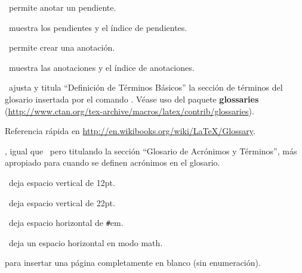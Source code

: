 
\pa\ permite anotar un pendiente.

\ muestra los pendientes y el índice de pendientes.


\pa\ permite crear una anotación.

\ muestra las anotaciones y el índice de anotaciones.



\ ajusta y titula ``Definición de Términos Básicos'' la sección de términos del glosario insertada por el comando . Véase uso del paquete \textbf{glossaries} (\url{http://www.ctan.org/tex-archive/macros/latex/contrib/glossaries}).

Referencia rápida en \url{http://en.wikibooks.org/wiki/LaTeX/Glossary}.

, igual que \ pero titulando la sección ``Glosario de Acrónimos y Términos'', más apropiado para cuando se definen acrónimos en el glosario.



\ deja espacio vertical de 12pt.

\ deja espacio vertical de 22pt.

\pa[\#]\ deja espacio horizontal de \texttt{\#}em.

\ deja un espacio horizontal en modo math.

 para insertar una página completamente en blanco (sin enumeración).



